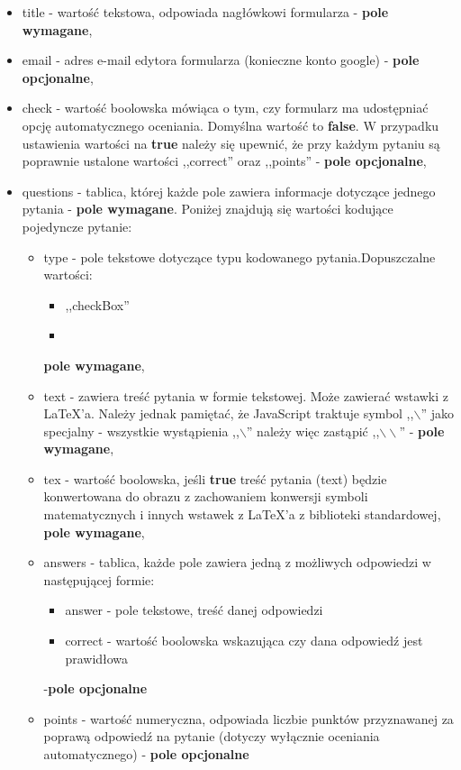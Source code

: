 \begin{itemize}
\item{title} - wartość tekstowa, odpowiada nagłówkowi formularza -  \textbf{pole wymagane},
\item{email} - adres e-mail edytora formularza (konieczne konto google) - \textbf{pole opcjonalne},
\item{check} - wartość boolowska mówiąca o tym, czy formularz ma udostępniać opcję automatycznego oceniania. Domyślna wartość to \textbf{false}. W przypadku ustawienia wartości na \textbf{true} należy się upewnić, że przy każdym pytaniu są poprawnie ustalone wartości ,,correct'' oraz ,,points'' - \textbf{pole opcjonalne},
\item{questions} - tablica, której każde pole zawiera informacje dotyczące jednego pytania - \textbf{pole wymagane}. Poniżej znajdują się wartości kodujące pojedyncze pytanie:
\begin{itemize}
\item{type} - pole tekstowe dotyczące typu kodowanego pytania.Dopuszczalne wartości:
\begin{itemize}
\item ,,checkBox''
\item
\end{itemize}
 \textbf{pole wymagane},
\item{text} - zawiera treść pytania w formie tekstowej. Może zawierać wstawki z \LaTeX{}'a. Należy jednak pamiętać, że JavaScript traktuje symbol ,,$\backslash$'' jako specjalny - wszystkie wystąpienia ,,$\backslash$'' należy więc zastąpić ,,$\backslash\backslash$'' - \textbf{pole wymagane},
\item{tex} - wartość boolowska, jeśli \textbf{true} treść pytania (text) będzie konwertowana do obrazu z zachowaniem konwersji symboli matematycznych i innych wstawek z \LaTeX{}'a z biblioteki standardowej, \textbf{pole wymagane},
\item{answers} - tablica, każde pole zawiera jedną z możliwych odpowiedzi w następującej formie:
\begin{itemize}
\item answer - pole tekstowe, treść danej odpowiedzi
\item correct - wartość boolowska wskazująca czy dana odpowiedź jest prawidłowa
\end{itemize} 
-\textbf{pole opcjonalne}
\item{points} - wartość numeryczna, odpowiada liczbie punktów przyznawanej za poprawą odpowiedź na pytanie (dotyczy wyłącznie oceniania automatycznego) - \textbf{pole opcjonalne}
\end{itemize}
\end{itemize}









